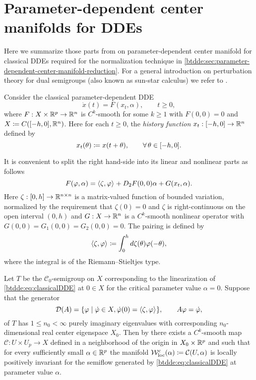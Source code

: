 \section{Parameter-dependent center manifolds for DDEs}
\label{btdde:sec:sunstar}

Here we summarize those parts from \cite{Switching2019} on parameter-dependent
center manifold for classical DDEs required for the normalization technique in
\cref{btdde:sec:parameter-dependent-center-manifold-reduction}. For a general
introduction on perturbation theory for dual semigroups (also known as sun-star
calculus) we refer to \cite{diekmann1995delay}.

Consider the classical parameter-dependent DDE
\begin{equation}
    \tag{DDE}
    \label{btdde:eq:classicalDDE}
    \dot{x}(t)= F(x_t, \alpha), \qquad t \ge 0,
\end{equation}
where $F: X \times \mathbb{R}^p \to \mathbb{R}^n$ is $C^k$-smooth for some $k \ge 1$ with
$F(0,0) = 0$ and $X \coloneqq C([-h,0],\mathbb{R}^n)$. Here for each $t \ge 0$, the
\emph{history function} $x_t : [-h,0] \to \mathbb{R}^n$ defined by
\[
  x_t(\theta) \coloneqq x(t + \theta), \qquad \forall\,\theta \in [-h,0].
\]

It is convenient to split the right hand-side into its linear and nonlinear
parts as follows
\begin{equation}
  \label{btdde:eq:classicalDDE12}
      F(\varphi,\alpha)= \langle \zeta,\varphi \rangle_{} + D_2F(0,0)\alpha + G(x_t, \alpha).
\end{equation}
Here $\zeta : [0,h] \to \mathbb{R}^{n \times n}$ is a matrix-valued function of
bounded variation, normalized by the requirement that $\zeta(0) = 0$ and
$\zeta$ is right-continuous on the open interval $(0,h)$ and $G : X \to \mathbb{R}^n$
is a $C^k$-smooth nonlinear operator with $G(0,0) = G_1(0,0) = G_2(0,0) = 0$.
The pairing is defined by
%
\begin{equation}
  \label{btdde:eq:lindde_shorthand}
  \langle \zeta,\varphi \rangle_{} \coloneqq \int_0^h{d\zeta(\theta)\varphi(-\theta}),
\end{equation}
where the integral is of the Riemann--Stieltjes type.

Let $T$ be the $\mathcal{C}_0$-semigroup on $X$ corresponding to the
linearization of \cref{btdde:eq:classicalDDE} at $0 \in X$ for the critical parameter
value $\alpha = 0$. Suppose that the generator 
\[
    \mathcal{D}{(A)}  = \{ \varphi \mid \dot {\varphi} \in X, \dot {\varphi}(0) = \langle \zeta,\varphi \rangle_{}\}, 
    \qquad 
    A\varphi = \dot {\varphi},
\]
of $T$ has $1 \le n_0 < \infty$ purely imaginary eigenvalues with corresponding
$n_0$-dimensional real center eigenspace $X_0$. Then by \cite[Corollary
20]{Switching2019} there exists a $C^k$-smooth map $\mathcal{C} : U \times U_p
\to X$ defined in a neighborhood of the origin in $X_0 \times \mathbb{R}^p$ and such
that for every sufficiently small $\alpha \in \mathbb{R}^p$ the manifold $\mathcal{W}^c_{\text{loc}}(\alpha)
\coloneqq \mathcal{C}(U,\alpha)$ is locally positively invariant for the semiflow
generated by \cref{btdde:eq:classicalDDE} at parameter value $\alpha$.

